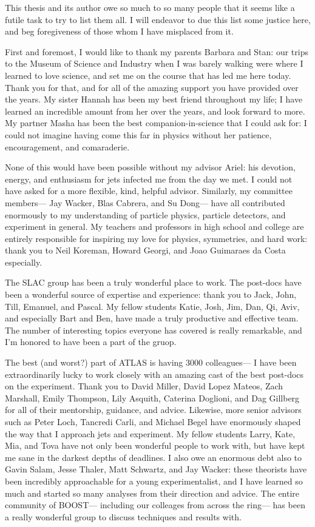 
This thesis and its author owe so much to so many people that it seems like a futile task to try to list them all. I will endeavor to due this list some justice here, and beg foregiveness of those whom I have misplaced from it.

First and foremost, I would like to thank my parents Barbara and Stan: our trips to the Museum of Science and Industry when I was barely walking were where I learned to love science, and set me on the course that has led me here today. Thank you for that, and for all of the amazing support you have provided over the years. My sister Hannah has been my best friend throughout my life; I have learned an incredible amount from her over the years, and look forward to more. My partner Masha has been the best companion-in-science that I could ask for: I could not imagine having come this far in physics without her patience, encouragement, and comaraderie. 

None of this would have been possible without my advisor Ariel: his devotion, energy, and enthusiasm for jets infected me from the day we met. I could not have asked for a more flexible, kind, helpful advisor. Similarly, my committee members--- Jay Wacker, Blas Cabrera, and Su Dong--- have all contributed enormously to my understanding of particle physics, particle detectors, and experiment in general. My teachers and professors in high school and college are entirely responsible for inspiring my love for physics, symmetries, and hard work: thank you to Neil Koreman, Howard Georgi, and Joao Guimaraes da Costa especially. 

The SLAC group has been a truly wonderful place to work. The post-docs have been a wonderful source of expertise and experience: thank you to Jack, John, Till, Emanuel, and Pascal. My fellow students Katie, Josh, Jim, Dan, Qi, Aviv, and especially Bart and Ben, have made a truly productive and effective team. The number of interesting topics everyone has covered is really remarkable, and I'm honored to have been a part of the gruop.

The best (and worst?) part of ATLAS is having 3000 colleagues--- I have been extraordinarily lucky to work closely with an amazing cast of the best post-docs on the experiment. Thank you to David Miller, David Lopez Mateos, Zach Marshall, Emily Thompson, Lily Asquith, Caterina Doglioni, and Dag Gillberg for all of their mentorship, guidance, and advice. Likewise, more senior advisors such as Peter Loch, Tancredi Carli, and Michael Begel have enormously shaped the way that I approach jets and experiment. My fellow students Larry, Kate, Mia, and Tova have not only been wonderful people to work with, but have kept me sane in the darkest depths of deadlines. I also owe an enormous debt also to Gavin Salam, Jesse Thaler, Matt Schwartz, and Jay Wacker: these theorists have been incredibly approachable for a young experimentalist, and I have learned so much and started so many analyses from their direction and advice. The entire community of BOOST--- including our colleages from across the ring--- has been a really wonderful group to discuss techniques and results with.


